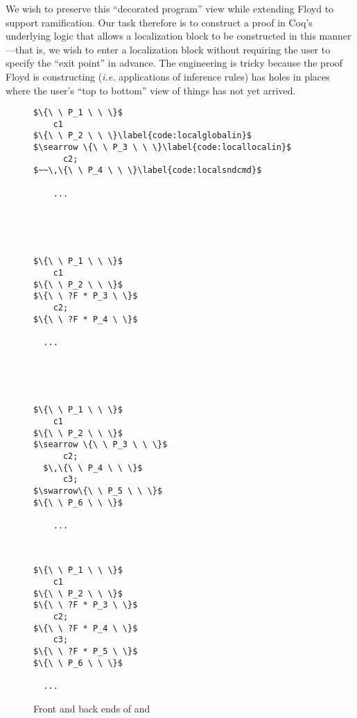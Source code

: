 We wish to preserve this ``decorated program'' view while extending Floyd to support ramification.  Our task therefore is to construct a proof in Coq's underlying logic that allows a localization block to be constructed in this manner---that is, we wish to enter a localization block without requiring the user to specify the ``exit point'' in advance.  The engineering is tricky because the proof Floyd is constructing (\emph{i.e.} applications of inference rules) has holes in places where the user's ``top to bottom'' view of things has not yet arrived.

\begin{figure}[t]
\begin{minipage}{.1\textwidth}
\begin{lstlisting}
$\{\ \ P_1 \ \ \}$
    c1
$\{\ \ P_2 \ \ \}\label{code:localglobalin}$
$\searrow \{\ \ P_3 \ \ \}\label{code:locallocalin}$
      c2;
$~~\,\{\ \ P_4 \ \ \}\label{code:localsndcmd}$

    ...



\end{lstlisting}
\end{minipage} \vline ~
\begin{minipage}{.11\textwidth}
\begin{lstlisting}[numbers=none]
$\{\ \ P_1 \ \ \}$
    c1
$\{\ \ P_2 \ \ \}$
$\{\ \ ?F * P_3 \ \}$
    c2;
$\{\ \ ?F * P_4 \ \}$

  ...



\end{lstlisting}
\end{minipage} \vline ~
\begin{minipage}{.11\textwidth}
\begin{lstlisting}[numbers=none]
$\{\ \ P_1 \ \ \}$
    c1
$\{\ \ P_2 \ \ \}$
$\searrow \{\ \ P_3 \ \ \}$
      c2;
  $\,\{\ \ P_4 \ \ \}$
      c3;
$\swarrow\{\ \ P_5 \ \ \}$
$\{\ \ P_6 \ \ \}$

    ...
\end{lstlisting}
\end{minipage} \vline ~
\begin{minipage}{.11\textwidth}
\begin{lstlisting}[numbers=none]
$\{\ \ P_1 \ \ \}$
    c1
$\{\ \ P_2 \ \ \}$
$\{\ \ ?F * P_3 \ \}$
    c2;
$\{\ \ ?F * P_4 \ \}$
    c3;
$\{\ \ ?F * P_5 \ \}$
$\{\ \ P_6 \ \ \}$

  ...
\end{lstlisting}
\end{minipage}
\caption{Front and back ends of  and }
\label{figure:backend}
\vspace{-2ex}
\end{figure}

